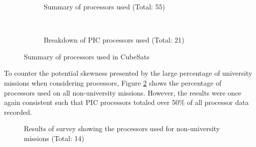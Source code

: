 \documentclass[11pt]{article}
\begin{document}
\begin{figure}[h!]
    \centering
    \begin{subfigure}[t]{0.5\textwidth}
        \centering
        \caption{Summary of processors used (Total: 55)}
    \end{subfigure}%
    ~ 
    \begin{subfigure}[t]{0.5\textwidth}
        \centering
        \caption{Breakdown of PIC processors used (Total: 21)}
    \end{subfigure}
    \caption{Summary of processors used in CubeSats}
		\label{processors}
\end{figure}

To counter the potential skewness presented by the large percentage of university missions when considering processors, Figure \ref{nonuniv} shows the percentage of processors used on all non-university missions.  However, the results were once again consistent such that PIC processors totaled over 50\% of all processor data recorded.
 
\begin{figure}[ht!]
\centering
{}
\caption{Results of survey showing the processors used for non-university missions (Total: 14)}
\label{nonuniv}
\end{figure}
\end{document}
